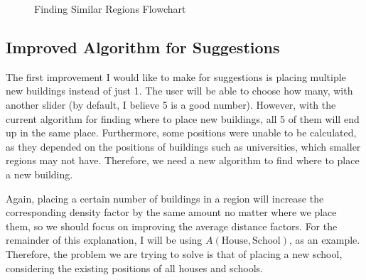 \documentclass[12pt]{report}
\begin{document}
\begin{figure}[H]
\centering
{}
\caption{Finding Similar Regions Flowchart}
\end{figure}

\subsection{Improved Algorithm for Suggestions}\label{sec:betterSuggestions}
The first improvement I would like to make for suggestions is placing multiple new buildings instead of just 1. The user will be able to choose how many, with another slider (by default, I believe 5 is a good number). However, with the current algorithm for finding where to place new buildings, all 5 of them will end up in the same place. Furthermore, some positions were unable to be calculated, as they depended on the positions of buildings such as universities, which smaller regions may not have. Therefore, we need a new algorithm to find where to place a new building.

Again, placing a certain number of buildings in a region will increase the corresponding density factor by the same amount no matter where we place them, so we should focus on improving the average distance factors. For the remainder of this explanation, I will be using $A\left(\text{House},\text{School}\right)$, as an example. Therefore, the problem we are trying to solve is that of placing a new school, considering the existing positions of all houses and schools.
\end{document}
